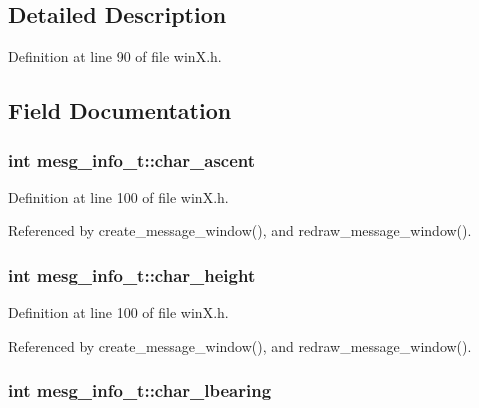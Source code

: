\subsection{Detailed Description}


Definition at line 90 of file win\+X.\+h.



\subsection{Field Documentation}
\hypertarget{structmesg__info__t_a737e633cc653b3e01eaf308564d362c3}{
\subsubsection[{char\+\_\+ascent}]{\setlength{\rightskip}{0pt plus 5cm}int mesg\+\_\+info\+\_\+t\+::char\+\_\+ascent}}\label{structmesg__info__t_a737e633cc653b3e01eaf308564d362c3}


Definition at line 100 of file win\+X.\+h.



Referenced by create\+\_\+message\+\_\+window(), and redraw\+\_\+message\+\_\+window().

\hypertarget{structmesg__info__t_af7ceb1e904683a4ef31352aa7697390e}{
\subsubsection[{char\+\_\+height}]{\setlength{\rightskip}{0pt plus 5cm}int mesg\+\_\+info\+\_\+t\+::char\+\_\+height}}\label{structmesg__info__t_af7ceb1e904683a4ef31352aa7697390e}


Definition at line 100 of file win\+X.\+h.



Referenced by create\+\_\+message\+\_\+window(), and redraw\+\_\+message\+\_\+window().

\hypertarget{structmesg__info__t_a8533deec9572890a70ba02b6cae67951}{
\subsubsection[{char\+\_\+lbearing}]{\setlength{\rightskip}{0pt plus 5cm}int mesg\+\_\+info\+\_\+t\+::char\+\_\+lbearing}}\label{structmesg__info__t_a8533deec9572890a70ba02b6cae67951}


